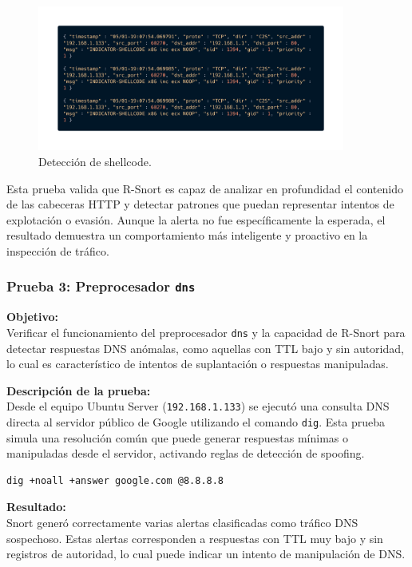\documentclass[11pt,a4paper,twoside]{report}
\begin{document}
\begin{figure}[H]
	\centering
	\includegraphics[width=0.9\textwidth]{pruebas_bien/seccion_uno/2.png}
	\caption{Detección de shellcode.}
\end{figure}

Esta prueba valida que R-Snort es capaz de analizar en profundidad el contenido de las cabeceras HTTP y detectar patrones que puedan representar intentos de explotación o evasión. Aunque la alerta no fue específicamente la esperada, el resultado demuestra un comportamiento más inteligente y proactivo en la inspección de tráfico.

\subsubsection*{Prueba 3: Preprocesador \texttt{dns}}

\textbf{Objetivo:} \\
Verificar el funcionamiento del preprocesador \texttt{dns} y la capacidad de R-Snort para detectar respuestas DNS anómalas, como aquellas con TTL bajo y sin autoridad, lo cual es característico de intentos de suplantación o respuestas manipuladas.\newline

\textbf{Descripción de la prueba:} \\
Desde el equipo Ubuntu Server (\texttt{192.168.1.133}) se ejecutó una consulta DNS directa al servidor público de Google utilizando el comando \texttt{dig}. Esta prueba simula una resolución común que puede generar respuestas mínimas o manipuladas desde el servidor, activando reglas de detección de spoofing.

\begin{lstlisting}[style=commandstyle]
	dig +noall +answer google.com @8.8.8.8
\end{lstlisting}

\pagebreak

\textbf{Resultado:} \\
Snort generó correctamente varias alertas clasificadas como tráfico DNS sospechoso. Estas alertas corresponden a respuestas con TTL muy bajo y sin registros de autoridad, lo cual puede indicar un intento de manipulación de DNS.
\end{document}
